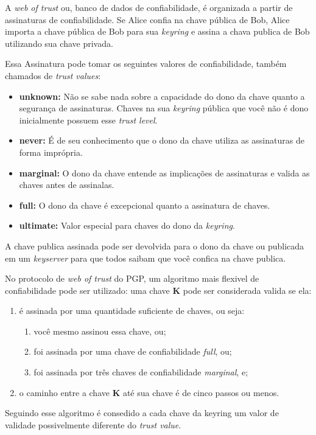 \documentclass[12pt, letterpaper]{article}
\begin{document}
A \textit{web of trust} ou, banco de dados de confiabilidade,
é organizada a partir de assinaturas de confiabilidade.
Se Alice confia na chave pública de Bob, Alice importa
a chave pública de Bob para sua \textit{keyring} e
assina a chava publica de Bob utilizando sua chave privada.

Essa Assinatura pode tomar os seguintes valores de confiabilidade,
também chamados de \textit{trust values}:
\begin{itemize}
  \item \textbf{unknown:}
    Não se sabe nada sobre a capacidade do dono da chave quanto a segurança de assinaturas.
    Chaves na sua \textit{keyring} pública que você não é dono inicialmente possuem esse \textit{trust level}.
  \item \textbf{never:}
    É de seu conhecimento que o dono da chave utiliza as assinaturas de forma imprópria.
  \item \textbf{marginal:}
    O dono da chave entende as implicações de assinaturas e valida as chaves antes de assinalas.
  \item \textbf{full:}
    O dono da chave é excepcional quanto a assinatura de chaves.
  \item \textbf{ultimate:}
    Valor especial para chaves do dono da \textit{keyring}.
\end{itemize}

A chave publica assinada pode ser devolvida para o dono da chave ou publicada em um
\textit{keyserver} para que todos saibam que você confica na chave publica.

No protocolo de \textit{web of trust} do PGP, um algoritmo mais flexivel de confiabilidade pode ser utilizado:
uma chave \textbf{K} pode ser considerada valida se ela:
\begin{enumerate}
    \item é assinada por uma quantidade suficiente de chaves, ou seja:
      \begin{enumerate}
          \item você mesmo assinou essa chave, ou;
          \item foi assinada por uma chave de confiabilidade \textit{full}, ou;
          \item foi assinada por três chaves de confiabilidade \textit{marginal}, e;
      \end{enumerate}
    \item o caminho entre a chave \textbf{K} até sua chave é de
      cinco passos ou menos.
\end{enumerate}

Seguindo esse algoritmo é consedido a cada chave da keyring um valor de validade possivelmente
diferente do \textit{trust value}.
\end{document}
